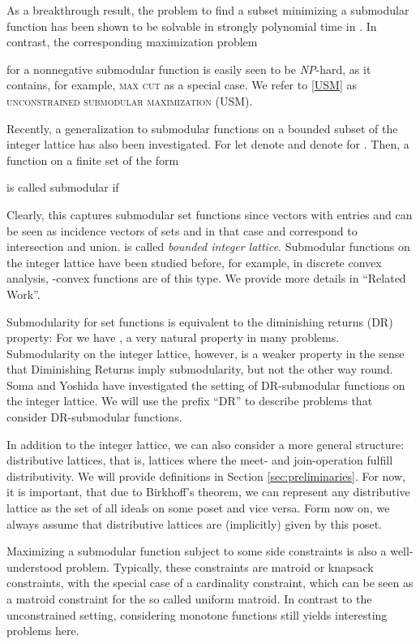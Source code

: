 \documentclass{article}
\newcommand{\NP}{\mbox{\slshape NP}}
\theoremstyle{plain}
\theoremstyle{definition}
\begin{document}
As a breakthrough result, the problem to find a subset  minimizing a submodular function 
has been shown to be solvable in strongly polynomial time in \cite{SubmodularMin1}.
In contrast, the corresponding maximization problem

for a nonnegative submodular function  is easily seen to be \NP-hard, as it contains,  for example,
\textsc{max cut} as a special case.
We refer to \eqref{USM} as \textsc{unconstrained submodular maximization (USM)}.

Recently, a generalization to submodular functions on a bounded subset of the integer lattice  has also been investigated.
For  let  denote  and  denote  
for . 
Then, a function   on a finite set  of the form 

is called submodular if 
 
Clearly, this captures submodular set functions since vectors with entries  and  can be seen as incidence vectors of 
sets and in that case  and  correspond to intersection and union.  is called \emph{bounded integer lattice}.
Submodular functions on the integer lattice have been studied before, for example, in discrete convex analysis, 
 -convex functions are of this type. We provide more details in ``Related Work''.  

 Submodularity for set functions is equivalent to the diminishing returns (DR) property: 
 For  we have , a very natural property in many problems.
 Submodularity on the integer lattice, however, is a weaker property in the sense that Diminishing Returns imply submodularity, but not the other way round.
 Soma and Yoshida \cite{SomaYoshi16} have investigated the setting of DR-submodular functions on the integer lattice. We will use the prefix ``DR'' to describe
 problems that consider DR-submodular functions. 
 
In addition to the integer lattice, we can also consider a more general structure: distributive lattices, that is, lattices where the meet- and join-operation 
 fulfill distributivity. We will provide definitions in Section \ref{sec:preliminaries}. 
 For now, it is important, that due to Birkhoff's theorem, we can represent
 any distributive lattice as the set of all ideals on some poset  and vice versa. 
 Form now on, we always assume that distributive lattices  are (implicitly) given by this poset.   

Maximizing a submodular function subject to some side constraints is also a well-understood problem. 
Typically, these constraints are matroid or knapsack constraints, with the special case of a cardinality constraint, which can be seen as a matroid constraint for 
the so called uniform matroid. 
In contrast to the unconstrained setting, considering monotone functions still yields interesting problems here. 
\end{document}
